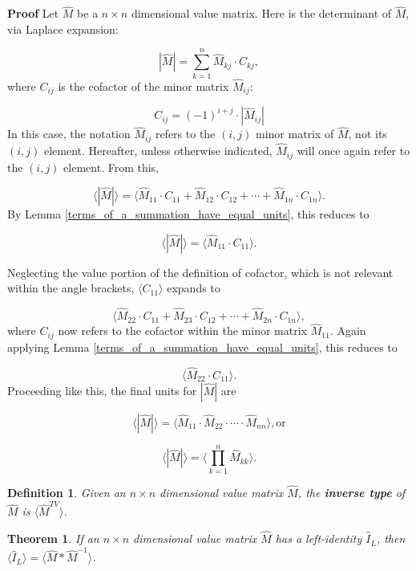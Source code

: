 \documentclass[10pt,letterpaper]{article}
\newtheorem{defn}{Definition}[section]
\newtheorem{thm}{Theorem}[section]
\newenvironment{proof}{\noindent\textbf{Proof} }{\qed \newline}
\newcommand{\qed}{\nobreak \ifvmode \relax \else
      \ifdim\lastskip<1.5em \hskip-\lastskip
      \hskip1.5em plus0em minus0.5em \fi \nobreak
      \vrule height0.75em width0.5em depth0.25em\fi}
\numberwithin{equation}{section}
\begin{document}
\begin{proof}Let $\hat M$ be a $n \times n$ dimensional value matrix.
  Here is the determinant of $\hat M$, via Laplace expansion:

\[ | \hat M | = \sum_{k=1}^n \hat M_{kj} \cdot C_{kj} , \] where $C_{ij}$ is the
cofactor of the minor matrix $\hat M_{ij}$:

\[ C_{ij} = (-1)^{i + j} \cdot | \hat M_{ij} | \] In this case, the
notation $\hat M_{ij}$ refers to the $(i, j)$ minor matrix of $\hat
M$, not its $(i, j)$ element. Hereafter, unless otherwise indicated,
$\hat M_{ij}$ will once again refer to the $(i, j)$ element.  From
this,

\[ \langle | \hat M | \rangle = \langle \hat M_{11} \cdot C_{11} +
\hat M_{12} \cdot C_{12} + \cdots + \hat M_{1n} \cdot C_{1n}\rangle
. \] By Lemma \ref{terms_of_a_summation_have_equal_units}, this
reduces to

\[ \langle | \hat M | \rangle = \langle \hat M_{11} \cdot C_{11}
\rangle . \]

Neglecting the value portion of the definition of cofactor, which is
not relevant within the angle brackets, $\langle C_{11} \rangle$
expands to

\[ \langle \hat M_{22} \cdot C_{11} + \hat M_{23} \cdot C_{12} +
\cdots + \hat M_{2n} \cdot C_{1n} \rangle , \] where $C_{ij}$ now
refers to the cofactor within the minor matrix $\hat M_{11}$.  Again
applying Lemma \ref{terms_of_a_summation_have_equal_units}, this
reduces to

\[ \langle \hat M_{22} \cdot C_{11} \rangle . \]  Proceeding like
this, the final units for $| \hat M |$ are

\[ \langle | \hat M | \rangle = \langle \hat M_{11} \cdot \hat M_{22}
\cdot \cdots \cdot \hat M_{nn} \rangle , \mbox{or} \]

\[ \langle | \hat M | \rangle = \langle \prod_{k=1}^n \hat M_{kk}
\rangle . \] \end{proof}

\begin{defn} \label{inverse_type_definition} Given an $n \times n$
dimensional value matrix $\hat M$, the \textbf{inverse type} of
$\hat M$ is $\langle \hat M^{TV} \rangle$. \end{defn}

\begin{thm} If an $n \times n$ dimensional value matrix $\hat M$
has a left-identity $\hat I_L$, then $\langle \hat I_L \rangle = \langle \hat M * \hat M^{-1} \rangle$. \end{thm}
\end{document}
